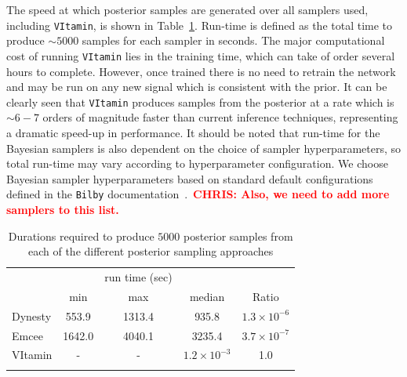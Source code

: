 \documentclass[%
showpacs,
 amsmath,amssymb,
 aps,
 twocolumn,
 prl,
 reprint,
floatfix,
]{revtex4-1}
\newcommand{\chris}[1]{\textbf{\textcolor{red}{CHRIS: #1}}}
\begin{document}
%
%
The speed at which posterior samples are generated over all samplers used,
including \texttt{VItamin}, is shown in Table~\ref{Tab:speed}. Run-time is defined as
the total time to produce $\sim 5000$ samples for each sampler in seconds.
The major computational cost of running \texttt{VItamin} lies in the training time, which can 
take of order several hours to complete. However, once trained there is no need to 
retrain the network and may be run on any new signal which is consistent with 
the prior. It can be clearly seen that \texttt{VItamin} produces samples from the posterior at a rate which is $\sim 6 - 7$ orders of magnitude faster than current inference
techniques, representing a dramatic speed-up in performance. It should be noted
that run-time for the Bayesian samplers is also dependent on the choice of
sampler hyperparameters, so total run-time may vary according to hyperparameter
configuration. We choose Bayesian sampler hyperparameters based on standard default configurations defined in the \texttt{Bilby}
documentation~\cite{1811.02042}.~\chris{Also, we need to add more samplers to this list.} 
 


%
% 
\begin{table}
\centering
\caption{Durations required to produce $5000$ posterior samples from each of
the different posterior sampling approaches}
\begin{tabular}[t]{lcccc}
\toprule
& & run time (sec) & & \\
& min & max & median & Ratio \\
\hline
Dynesty & 553.9 & 1313.4 & 935.8 & $1.3\times 10^{-6}$ \\
Emcee & 1642.0 & 4040.1 & 3235.4 & $3.7\times 10^{-7}$ \\
VItamin & - & - & $1.2\times 10^{-3}$ & 1.0 \\
\botrule
\end{tabular}
\label{Tab:speed}
\end{table}
\end{document}
